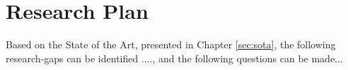 \chapter{Research Plan}
Based on the State of the Art, presented in Chapter \ref{sec:sota}, the following research-gaps can be identified ...., and the following questions can be made...